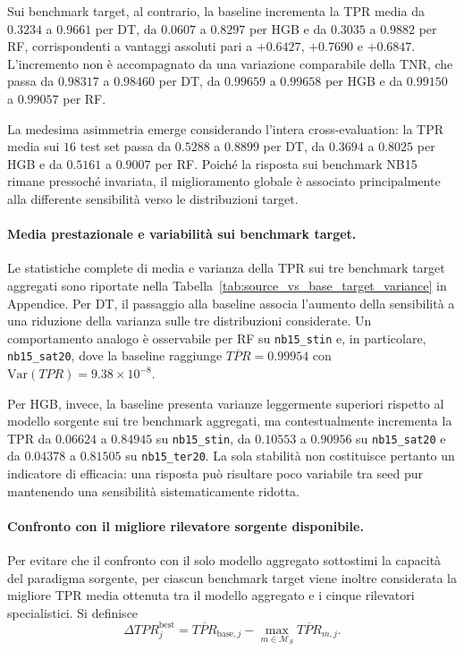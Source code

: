 Sui benchmark target, al contrario, la baseline incrementa la TPR media da $0.3234$ a $0.9661$ per DT, da $0.0607$ a $0.8297$ per HGB e da
$0.3035$ a $0.9882$ per RF, corrispondenti a vantaggi assoluti pari a $+0.6427$, $+0.7690$ e $+0.6847$. 
L'incremento non è accompagnato da una variazione comparabile della TNR, che passa da $0.98317$ a $0.98460$ per DT, da $0.99659$ a $0.99658$ per HGB e da $0.99150$ a $0.99057$ per RF.

La medesima asimmetria emerge considerando l'intera cross-evaluation: la TPR media sui $16$ test set passa da $0.5288$ a $0.8899$ per DT, da $0.3694$ a $0.8025$ per HGB e da $0.5161$ a $0.9007$ per RF. 
Poiché la risposta sui benchmark NB15 rimane pressoché invariata, il miglioramento globale è associato principalmente alla differente sensibilità verso le distribuzioni target.

\paragraph{Media prestazionale e variabilità sui benchmark target.}
Le statistiche complete di media e varianza della TPR sui tre benchmark target aggregati sono riportate nella Tabella~\ref{tab:source_vs_base_target_variance} in Appendice. 
Per DT, il passaggio alla baseline associa l'aumento della sensibilità a una riduzione della varianza sulle tre distribuzioni considerate. 
Un comportamento analogo è osservabile per RF su \texttt{nb15\_stin} e, in particolare, \texttt{nb15\_sat20}, dove la baseline raggiunge $\overline{TPR}=0.99954$ con $\mathrm{Var}(TPR)=9.38\times10^{-8}$.

Per HGB, invece, la baseline presenta varianze leggermente superiori rispetto al modello sorgente sui tre benchmark aggregati, ma contestualmente incrementa la TPR da $0.06624$ a $0.84945$ su \texttt{nb15\_stin}, da $0.10553$ a $0.90956$ su \texttt{nb15\_sat20} e da $0.04378$ a $0.81505$ su \texttt{nb15\_ter20}. 
La sola stabilità non costituisce pertanto un indicatore di efficacia: una risposta può risultare poco variabile tra seed pur mantenendo una sensibilità sistematicamente ridotta.

\paragraph{Confronto con il migliore rilevatore sorgente disponibile.}
Per evitare che il confronto con il solo modello aggregato sottostimi la capacità del paradigma sorgente, per ciascun benchmark target viene inoltre considerata la migliore TPR media ottenuta tra il modello aggregato e i cinque rilevatori specialistici. 
Si definisce
\begin{equation}
    \Delta TPR^{\mathrm{best}}_j =
    \overline{TPR}_{\mathrm{base},j}
    -
    \max_{m\in\mathcal{M}_{S}}
    \overline{TPR}_{m,j}.
    \label{eq:delta_tpr_best_source_baseline}
\end{equation}

